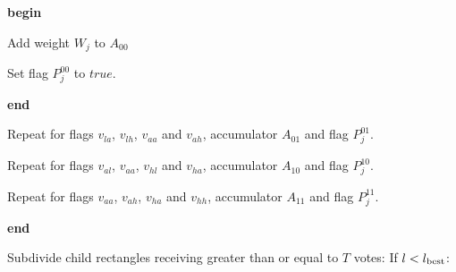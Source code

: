\begin{indent_para}
   {\bf begin}
   \begin{indent_para}
    Add weight $W_j$ to $A_{00}$

    Set flag $P^{00}_j$ to $true$.
   \end{indent_para}
   {\bf end}

   Repeat for flags $v_{la}$, $v_{lh}$, $v_{aa}$ and $v_{ah}$, accumulator
   $A_{01}$ and flag $P^{01}_j$.
   
   Repeat for flags $v_{al}$, $v_{aa}$, $v_{hl}$ and $v_{ha}$, accumulator
   $A_{10}$ and flag $P^{10}_j$.
   
   Repeat for flags $v_{aa}$, $v_{ah}$, $v_{ha}$ and $v_{hh}$, accumulator
   $A_{11}$ and flag $P^{11}_j$.
   
  \end{indent_para}
  {\bf end}

  Subdivide child rectangles receiving greater than or equal to $T$ votes:
  If $l < l_{\rm best}$:

